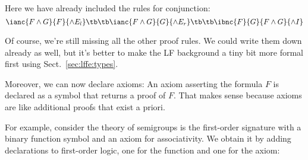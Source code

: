 \begin{twelfsig}
\decl{\FORM}{\type} \\
\decl{\PROOF}{\FORM\arr\type} \\[.5cm]
\\
\\
\\
\\
\\
\\
\\[.5cm]
 \\
\\
\\
 \\
\end{twelfsig}

Here we have already included the rules for conjunction:
\[\ianc{F\wedge G}{F}{\wedge E_l} \tb\tb \ianc{F\wedge G}{G}{\wedge E_r} \tb\tb \ibnc{F}{G}{F\wedge G}{\wedge I}\]

Of course, we're still missing all the other proof rules.
We could write them down already as well, but it's better to make the LF background a tiny bit more formal first using Sect.~\ref{sec:lffe:types}.
\medskip

Moreover, we can now declare axioms: An axiom asserting the formula $F$ is declared as a symbol that returns a proof of $F$. That makes sense because axioms are like additional proofs that exist a priori.

For example, consider the theory of semigroups is the first-order signature with a binary function symbol and an axiom for associativity. We obtain it by adding declarations to first-order logic, one for the function and one for the axiom:

\begin{twelfsig}
\\
\\
 \\
\tsigend
\end{twelfsig}

